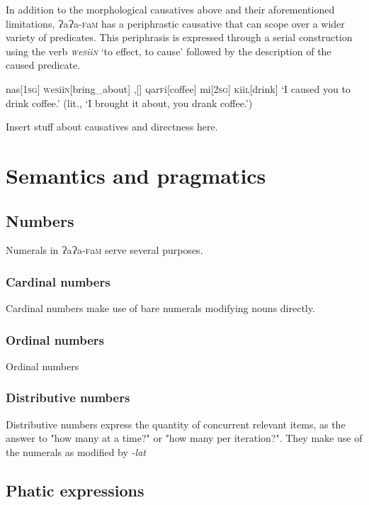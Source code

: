 \documentclass[a4paper,10pt,twoside,openright]{memoir}
\newcommand{\lang}{{\bigglot}a{\bigglot}a-\textsc{f}a\textsc{m}}
\newcommand{\bigglot}{Ɂ}
\newcommand{\famwordold}[5]{#1\textsc{#2}#3\textsc{#4}#5}
\begin{document}
In addition to the morphological causatives above and their aforementioned limitations, \lang{} has a periphrastic causative that can scope over a wider variety of predicates. This periphrasis is expressed through a serial construction using the verb \textit{\textsc{w}\famwordold{e}{s}{ii}{n}{}} `to effect, to cause' followed by the description of the caused predicate. 

\ex
\begingl
nas[\textsc{1sg}]
\textsc{w}\famwordold{e}{s}{ii}{n}{}[bring\_about]
,[]
\famwordold{}{q}{ar}{f}{i}[coffee]
mi[\textsc{2sg}]
\famwordold{}{k}{ii}{l}{}[drink]
\glft `I caused you to drink coffee.' (lit., `I brought it about, you drank coffee.')
\endgl
\xe

Insert stuff about causatives and directness here.

\chapter{Semantics and pragmatics}

\section{Numbers}

Numerals in {\lang} serve several purposes. 

\subsection{Cardinal numbers}

Cardinal numbers make use of bare numerals modifying nouns directly.

\subsection{Ordinal numbers}

Ordinal numbers 

\subsection{Distributive numbers}

Distributive numbers express the quantity of concurrent relevant items, as the answer to "how many at a time?" or "how many per iteration?". They make use of the numerals as modified by \emph{-lat}

\section{Phatic expressions}
\end{document}
